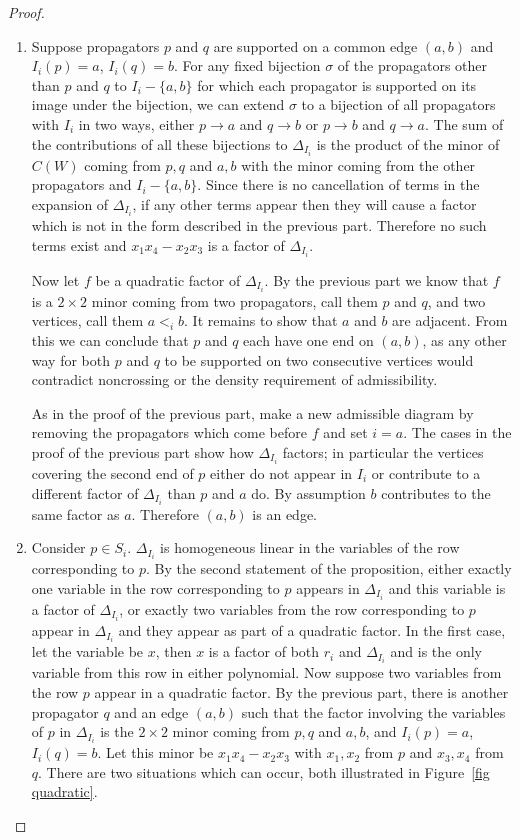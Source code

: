 \documentclass[11pt]{article}
\theoremstyle{remark}
\theoremstyle{definition}
\begin{document}
\begin{proof}
\begin{enumerate}
    \item Suppose propagators $p$ and $q$ are supported on a common edge $(a,b)$ and $I_i(p)=a$, $I_i(q)=b$.  For any fixed bijection $\sigma$ of the propagators other than $p$ and $q$ to $I_i -\{a,b\}$ for which each propagator is supported on its image under the bijection, we can extend $\sigma$ to a bijection of all propagators with $I_i$ in two ways, either $p\rightarrow a$ and $q\rightarrow b$ or $p\rightarrow b$ and $q\rightarrow a$.  The sum of the contributions of all these bijections to $\Delta_{I_i}$ is the product of the minor of $C(W)$ coming from $p, q$ and $a,b$ with the minor coming from the other propagators and $I_i - \{a,b\}$.  Since there is no cancellation of terms in the expansion of $\Delta_{I_i}$, if any other terms appear then they will cause a factor which is not in the form described in the previous part.  Therefore no such terms exist and $x_1x_4-x_2x_3$ is a factor of $\Delta_{I_i}$.

Now let $f$ be a quadratic factor of $\Delta_{I_i}$.  By the previous part we know that $f$ is a $2\times 2$ minor coming from two propagators, call them $p$ and $q$, and two vertices, call them $a <_i b$.  It remains to show that $a$ and $b$ are adjacent.  From this we can conclude that $p$ and $q$ each have one end on $(a,b)$, as any other way for both $p$ and $q$ to be supported on two consecutive vertices would contradict noncrossing or the density requirement of admissibility.

As in the proof of the previous part, make a new admissible diagram by removing the propagators which come before $f$ and set $i=a$.  The cases in the proof of the previous part show how $\Delta_{I_i}$ factors; in particular the vertices covering the second end of $p$ either do not appear in $I_i$ or contribute to a different factor of $\Delta_{I_i}$ than $p$ and $a$ do.  By assumption $b$ contributes to the same factor as $a$.  Therefore $(a,b)$ is an edge.
    \item Consider $p\in S_i$.  $\Delta_{I_i}$ is homogeneous linear in the variables of the row corresponding to $p$.  By the second statement of the proposition, either exactly one variable in the row corresponding to $p$ appears in $\Delta_{I_i}$ and this variable is a factor of $\Delta_{I_i}$, or exactly two variables from the row corresponding to $p$ appear in $\Delta_{I_i}$ and they appear as part of a quadratic factor.  In the first case, let the variable be $x$, then $x$ is a factor of both $r_i$ and $\Delta_{I_i}$ and is the only variable from this row in either polynomial.  Now suppose two variables from the row $p$ appear in a quadratic factor.  By the previous part, there is another propagator $q$ and an edge $(a,b)$ such that the factor involving the variables of $p$ in $\Delta_{I_i}$ is the $2\times 2$ minor coming from $p, q$ and $a, b$, and $I_i(p)=a$, $I_i(q)=b$.  Let this minor be $x_1x_4-x_2x_3$ with $x_1, x_2$ from $p$ and $x_3,x_4$ from $q$.  There are two situations which can occur, both illustrated in Figure~\ref{fig quadratic}.


\end{enumerate}
\end{proof}
\end{document}
